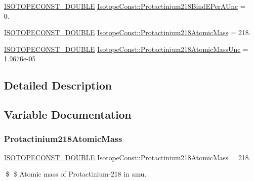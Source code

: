 \begin{DoxyCompactItemize}
\item 
\mbox{\hyperlink{group___isotope_const-_macros_ga8f45a7272ce02c0b4c65c44636ed719a}{I\+S\+O\+T\+O\+P\+E\+C\+O\+N\+S\+T\+\_\+\+D\+O\+U\+B\+LE}} \mbox{\hyperlink{group___isotope_const-_protactinium-_pa218_ga0d22e87a599001a26e43befe1aad0556}{Isotope\+Const\+::\+Protactinium218\+Bind\+E\+Per\+A\+Unc}} = 0.
\item 
\mbox{\hyperlink{group___isotope_const-_macros_ga8f45a7272ce02c0b4c65c44636ed719a}{I\+S\+O\+T\+O\+P\+E\+C\+O\+N\+S\+T\+\_\+\+D\+O\+U\+B\+LE}} \mbox{\hyperlink{group___isotope_const-_protactinium-_pa218_gae2105d6cb88b4218d5d659fa1f2c0ec3}{Isotope\+Const\+::\+Protactinium218\+Atomic\+Mass}} = 218.
\item 
\mbox{\hyperlink{group___isotope_const-_macros_ga8f45a7272ce02c0b4c65c44636ed719a}{I\+S\+O\+T\+O\+P\+E\+C\+O\+N\+S\+T\+\_\+\+D\+O\+U\+B\+LE}} \mbox{\hyperlink{group___isotope_const-_protactinium-_pa218_ga270ae955f6188a5862f66f8250da59a3}{Isotope\+Const\+::\+Protactinium218\+Atomic\+Mass\+Unc}} = 1.\+9676e-\/05
\end{DoxyCompactItemize}


\subsection{Detailed Description}


\subsection{Variable Documentation}
\mbox{\label{group___isotope_const-_protactinium-_pa218_gae2105d6cb88b4218d5d659fa1f2c0ec3}} 
\subsubsection{\texorpdfstring{Protactinium218\+Atomic\+Mass}{Protactinium218AtomicMass}}
{\footnotesize\ttfamily \mbox{\hyperlink{group___isotope_const-_macros_ga8f45a7272ce02c0b4c65c44636ed719a}{I\+S\+O\+T\+O\+P\+E\+C\+O\+N\+S\+T\+\_\+\+D\+O\+U\+B\+LE}} Isotope\+Const\+::\+Protactinium218\+Atomic\+Mass = 218.}

\$ \$ Atomic mass of Protactinium-\/218 in amu. \mbox{\label{group___isotope_const-_protactinium-_pa218_ga270ae955f6188a5862f66f8250da59a3}} 
